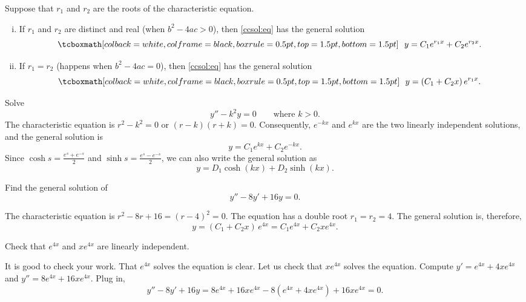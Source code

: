 \begin{theorem}
Suppose that $r_1$ and $r_2$ are the roots of the characteristic equation.
\begin{enumerate}[(i)]
\item If $r_1$ and $r_2$ are distinct and real (when $b^2 - 4ac > 0$),
then \eqref{ccsol:eq} has the general solution
\begin{equation*}
\mybxbg{~~
y = C_1 e^{r_1 x} + C_2 e^{r_2 x} .
~~}
\end{equation*}
\item If $r_1 = r_2$ (happens when $b^2 - 4ac = 0$), 
then \eqref{ccsol:eq} has the general solution
\begin{equation*}
\mybxbg{~~
y = (C_1 + C_2 x)\, e^{r_1 x} .
~~}
\end{equation*}
\end{enumerate}
\end{theorem}

\begin{example} \label{example:expsecondorder}
Solve
\begin{equation*}
y'' - k^2 y = 0 \qquad \text{where } k > 0 .
\end{equation*}
The characteristic equation is $r^2 - k^2 = 0$ or 
$(r-k)(r+k) = 0$.  Consequently, $e^{-k x}$ and $e^{kx}$ are the two
linearly independent solutions, and the general solution is
\begin{equation*}
y = C_1 e^{kx} + C_2e^{-kx} .
\end{equation*}
Since
$\cosh s = \frac{e^s+e^{-s}}{2}$
and
$\sinh s = \frac{e^s-e^{-s}}{2}$,
we can also write the general solution
as
\begin{equation*}
y = D_1 \cosh(kx) + D_2 \sinh(kx) .
\end{equation*}
\end{example}

\begin{example}
Find the general solution of
\begin{equation*}
y'' -8 y' + 16 y = 0 .
\end{equation*}

The characteristic equation is $r^2 - 8 r + 16 = {(r-4)}^2 = 0$.
The equation has a 
double root $r_1 = r_2 = 4$.  The general solution is, therefore,
\begin{equation*}
y = (C_1 + C_2 x)\, e^{4 x} = C_1 e^{4x} + C_2 x e^{4x} .
\end{equation*}

\begin{exercise}
Check that $e^{4x}$ and $x e^{4x}$ are linearly independent.
\end{exercise}

It is good to check your work.
That $e^{4x}$ solves the equation is clear.
Let us check that
$x e^{4x}$ solves the equation.
Compute
$y' = e^{4x} + 4xe^{4x}$ and
$y'' = 8 e^{4x} + 16xe^{4x}$.  Plug in,
\begin{equation*}
y'' - 8 y' + 16 y = 
8 e^{4x} + 16xe^{4x} - 8(e^{4x} + 4xe^{4x}) + 16 xe^{4x} = 
0 .
\end{equation*}
\end{example}

